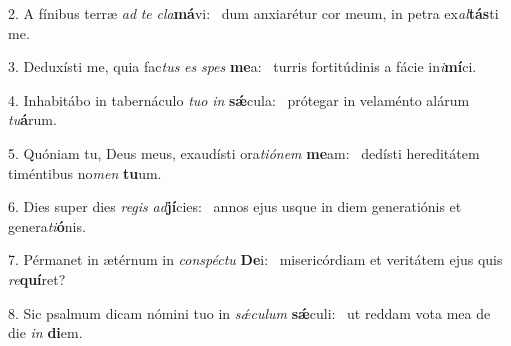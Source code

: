 2. A fínibus terræ \textit{ad} \textit{te} \textit{cla}\textbf{má}vi: \ast\  dum anxiarétur cor meum, in petra ex\textit{al}\textbf{tás}ti me.\

3. Deduxísti me, quia fac\textit{tus} \textit{es} \textit{spes} \textbf{me}a: \ast\  turris fortitúdinis a fácie in\textit{i}\textbf{mí}ci.\

4. Inhabitábo in tabernáculo \textit{tu}\textit{o} \textit{in} \textbf{sǽ}cula: \ast\  prótegar in velaménto alárum \textit{tu}\textbf{á}rum.\

5. Quóniam tu, Deus meus, exaudísti ora\textit{ti}\textit{ó}\textit{nem} \textbf{me}am: \ast\  dedísti hereditátem timéntibus no\textit{men} \textbf{tu}um.\

6. Dies super dies \textit{re}\textit{gis} \textit{ad}\textbf{jí}cies: \ast\  annos ejus usque in diem generatiónis et genera\textit{ti}\textbf{ó}nis.\

7. Pérmanet in ætérnum in \textit{con}\textit{spéc}\textit{tu} \textbf{De}i: \ast\  misericórdiam et veritátem ejus quis \textit{re}\textbf{quí}ret?\

8. Sic psalmum dicam nómini tuo in \textit{sǽ}\textit{cu}\textit{lum} \textbf{sǽ}culi: \ast\  ut reddam vota mea de die \textit{in} \textbf{di}em.\

